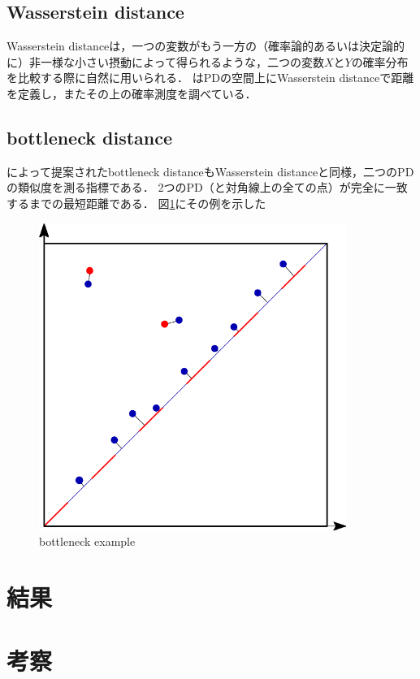 \documentclass{jarticle}
\begin{document}
\subsection{Wasserstein distance}
Wasserstein distanceは，一つの変数がもう一方の（確率論的あるいは決定論的に）非一様な小さい摂動によって得られるような，二つの変数$X$と$Y$の確率分布を比較する際に自然に用いられる．
\cite{Turner2014}はPDの空間上にWasserstein distanceで距離を定義し，またその上の確率測度を調べている．



\subsection{bottleneck distance}
\cite{Bubenik2015}によって提案されたbottleneck distanceもWasserstein distanceと同様，二つのPDの類似度を測る指標である．
2つのPD（と対角線上の全ての点）が完全に一致するまでの最短距離である．
図\ref{fig:bottle}にその例を示した
\begin{figure}[H]
	\begin{center}
		\includegraphics[width=10cm]{fig/bottleneck.png}
		\caption{bottleneck example}
		\label{fig:bottle}
	\end{center}
\end{figure}
\section{結果}

\section{考察}



\end{document}
